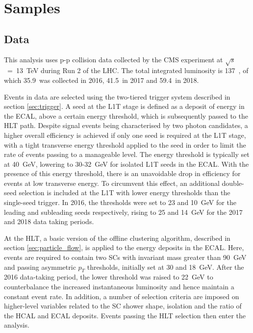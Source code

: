 
\section{Samples}
\subsection{Data}
This analysis uses p-p collision data collected by the CMS experiment at $\sqrt{s}$~=~13~TeV during Run 2 of the LHC. The total integrated luminosity is 137~\fbinv, of which 35.9~\fbinv was collected in 2016, 41.5~\fbinv in 2017 and 59.4~\fbinv in 2018.

Events in data are selected using the two-tiered trigger system described in section \ref{sec:trigger}. A seed at the L1T stage is defined as a deposit of energy in the ECAL, above a certain energy threshold, which is subsequently passed to the HLT path. Despite signal events being characterised by two photon candidates, a higher overall efficiency is achieved if only one seed is required at the L1T stage, with a tight transverse energy threshold applied to the seed in order to limit the rate of events passing to a manageable level. The energy threshold is typically set at 40~GeV, lowering to 30-32~GeV for isolated L1T seeds in the ECAL. With the presence of this energy threshold, there is an unavoidable drop in efficiency for \Hgg events at low transverse energy. To circumvent this effect, an additional double-seed selection is included at the L1T with lower energy thresholds than the single-seed trigger. In 2016, the thresholds were set to 23 and 10~GeV for the leading and subleading seeds respectively, rising to 25 and 14~GeV for the 2017 and 2018 data taking periods.

At the HLT, a basic version of the offline clustering algorithm, described in section \ref{sec:particle_flow}, is applied to the energy deposits in the ECAL. Here, events are required to contain two SCs with invariant mass greater than 90~GeV and passing asymmetric $p_T$ thresholds, initially set at 30 and 18~GeV. After the 2016 data-taking period, the lower threshold was raised to 22~GeV to counterbalance the increased instantaneous luminosity and hence maintain a constant event rate. In addition, a number of selection criteria are imposed on higher-level variables related to the SC shower shape, isolation and the ratio of the HCAL and ECAL deposits. Events passing the HLT selection then enter the \Hgg analysis.

